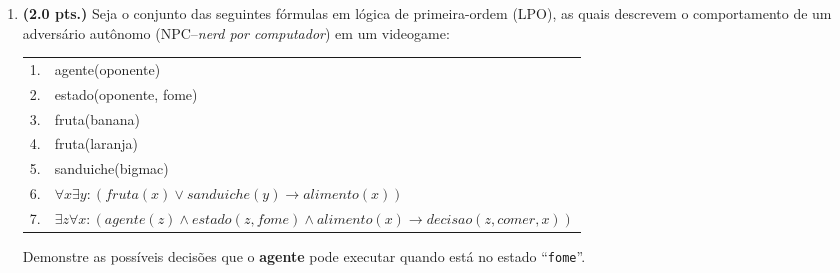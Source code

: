 \documentclass[a4paper,11pt]{article}
\begin{document}
\begin{enumerate}
\begin{comment}
\item {\bf (1.5 pts)} Aplicando De Morgan aos
quantificadores das fórmulas de LPO, dar a
negação das seguintes sentenças lógicas:
\begin{enumerate}
\setlength{\itemsep}{-2pt}
 \item $ \forall x \:\: \exists y \:\:(p(x) \wedge \sim q(y))$
 \item $ \forall x\:\: \forall y \:\: \sim (\sim p(x) \vee \sim q(y))$
 \item $ \exists x \:\:\forall y\:\: (p(x)\rightarrow q(y))$
 \item $ \forall x\:\: \exists y\:\: (\sim p(x) \vee \sim q(y))$
  \item  $ \forall y\:\: (p(y) \rightarrow \exists x \:\: q(x))$
  \item  $ \forall x\:\: (p(x) \leftrightarrow \sim \exists y \:\: r(y) )$
\end{enumerate}
PS: Lembre que De Morgan não se aplica com os conectivos $\leftrightarrow$ e $\rightarrow$.
\end{comment}

\item {\bf (2.0 pts.)} Seja o conjunto das seguintes fórmulas em lógica de primeira-ordem (LPO), as quais descrevem o comportamento de um adversário 
autônomo (NPC--\textit{nerd por computador}) em um videogame:\\
\begin{tabular}{ll}
\\  \hline \hline
  1. & agente(oponente) \\
  2. & estado(oponente, fome) \\
  3. & fruta(banana) \\
  4. & fruta(laranja) \\
  5. & sanduiche(bigmac) \\
  6. & $\forall x \exists y: (fruta(x) \vee sanduiche(y) \rightarrow alimento(x) )$ \\
  7. & $\exists z \forall x: (agente(z) \wedge estado(z, fome) \wedge alimento(x) \rightarrow decisao(z, comer, x))$ \\
    \hline \hline
 \end{tabular}

Demonstre as possíveis decisões que o \textbf{agente} pode executar quando está no estado ``{\tt fome}''.



\end{enumerate}
\end{document}
